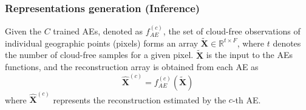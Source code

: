 \documentclass[journal,article,submit,pdftex,moreauthors]{Definitions/mdpi}
\begin{document}

\subsubsection{Representations generation (Inference)}\label{methodology:inference}
Given the $C$ trained \ac{AE}s, denoted as $f_{AE}^{(c)}$, the set of cloud-free observations of individual geographic points (pixels) forms an array $\mathbf{\tilde{X}} \in \mathbb{R}^{t \times F}$, where $t$ denotes the number of cloud-free samples for a given pixel. $\mathbf{\tilde{X}}$ is the input to the \ac{AE}s functions, and the reconstruction array is obtained from each AE as
\begin{equation}
	\mathbf{\hat{X}}^{(c)} = f_{AE}^{(c)}(\mathbf{\tilde{X}})
\end{equation}
where $\mathbf{\hat{X}}^{(c)}$ represents the reconstruction estimated by the $c$-th \ac{AE}. 
\end{document}
